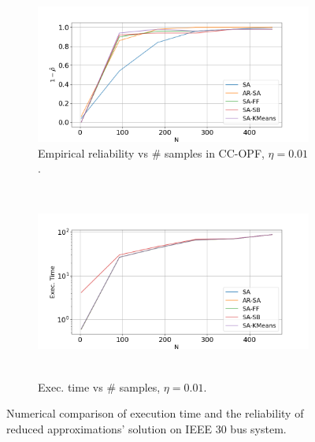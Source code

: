 \begin{figure}[hbt]
    \centering
    \begin{subfigure}{.9\textwidth}
      \centering
      \hspace{-0mm}\includegraphics[width=0.99\linewidth]{Dissertation/images/dynamic/ieee30/1_beta_N_453_eta_0.01.png}
      \caption{Empirical reliability %
      vs $\#$ samples  in CC-OPF, $\eta = 0.01$.}
      \label{fig:ieee30conservatism}
    \end{subfigure}\\
        
    \begin{subfigure}{.9\textwidth}
      \centering
\hspace{10mm}\includegraphics[width=0.99\linewidth]{Dissertation/images/dynamic/ieee30/exec_time_N_453_eta_0.01.png}~~~~~~\hfill
      \caption{Exec. time vs $\#$ samples, $\eta = 0.01$.
      }
      \label{fig:ieee30time}
    \end{subfigure}
    \caption{Numerical comparison of execution time and the reliability of reduced approximations' solution on IEEE 30 bus system.  
    }
\label{fig:ar-sa-ieee30}
\end{figure}

